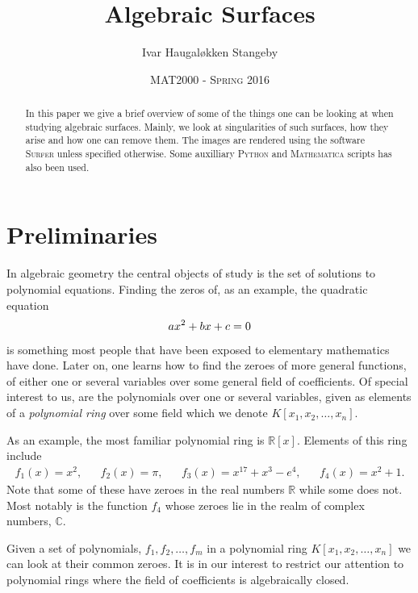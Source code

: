 \documentclass{article}
\title{Algebraic Surfaces}
\author{Ivar Haugal{\o}kken Stangeby}
\date{\textsc{MAT2000 - Spring 2016}}
\newcommand{\R}{\ensuremath{\mathbb{R}}}
\newcommand{\C}{\ensuremath{\mathbb{C}}}
\begin{document}
    \maketitle

    \begin{abstract}
       In this paper we give a brief overview of some of the things one can be
       looking at when studying algebraic surfaces.  Mainly, we look at
       singularities of such surfaces, how they arise and how one can remove
       them. The images are rendered using the software \textsc{Surfer} unless
       specified otherwise. Some auxilliary \textsc{Python} and
       \textsc{Mathematica} scripts has also been used.
    \end{abstract}

    \tableofcontents

    \section{Preliminaries}
    \label{sec:preliminaries}
    
    In algebraic geometry the central objects of study is the set of solutions
    to polynomial equations. Finding the zeros of, as an example, the quadratic
    equation
    \begin{equation}
        \notag
        ax^2 + bx + c = 0
    \end{equation}
    is something most people that have been exposed to elementary mathematics
    have done. Later on, one learns how to find the zeroes of more general
    functions, of either one or several variables over some general field of
    coefficients. Of special interest to us, are the polynomials over one or
    several variables, given as elements of a \emph{polynomial ring} over some
    field which we denote $K[x_1, x_2, \ldots, x_n]$.

    As an example, the most familiar polynomial ring is $\R[x]$. Elements of
    this ring include
    \begin{align*}
        f_1(x) = x^2, && f_2(x) = \pi, && f_3(x) = x^{17} + x^{3} - e^{4}, && f_4(x) = x^2 + 1.
    \end{align*} 
    Note that some of these have zeroes in the real numbers $\R$ while some
    does not. Most notably is the function $f_4$ whose zeroes lie in the realm
    of complex numbers, $\C$.

    Given a set of polynomials, $f_1, f_2, \ldots, f_m$ in a polynomial ring
    $K[x_1, x_2, \ldots, x_n]$ we can look at their common zeroes. It is in our
    interest to restrict our attention to polynomial rings where the field of
    coefficients is algebraically closed.
\end{document}
